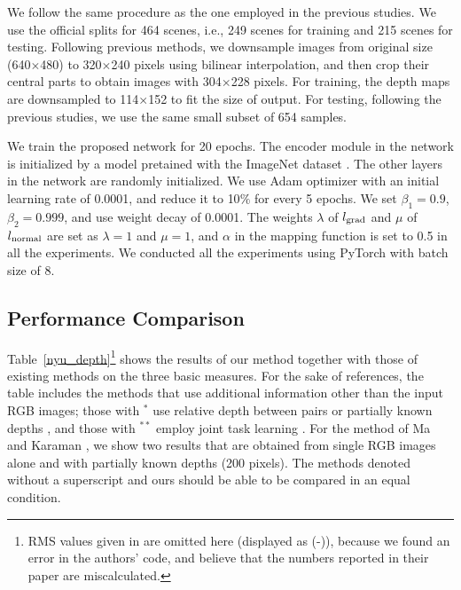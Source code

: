 \documentclass[10pt,twocolumn,letterpaper]{article}
\begin{document}
We follow the same procedure as the one employed in the previous studies.
We use the official splits for 464 scenes, i.e., 249 scenes for training and 215 scenes for testing. 
Following previous methods, we downsample images from original size (640$\times$480) to 320$\times$240 pixels using bilinear interpolation, and then crop their central parts to obtain images with 304$\times$228 pixels.  For training, the depth maps are downsampled to 114$\times$152 to fit the size of output. 
For testing, following the previous studies, we use the same small subset of 654 samples. 

We train the proposed network for 20 epochs. The encoder module in the network is initialized by a model pretained with the ImageNet dataset \cite{deng2009imagenet}. The other layers in the network are randomly initialized. 
We use Adam optimizer with an initial learning rate of 0.0001, and reduce it to 10$\%$ for every 5 epochs. We set $\beta_{1}=0.9$, $\beta_{2}=0.999$, and use weight decay of 0.0001.
The weights $\lambda$ of $l_{\rm grad}$ and $\mu$ of $l_{\rm normal}$ are set as $\lambda=1$ and $\mu=1$, and $\alpha$ in the mapping function is set to 0.5 in all the experiments. 
We conducted all the experiments using PyTorch \cite{paszke2017automatic} with batch size of 8. 




\subsection{Performance Comparison}
Table~\ref{nyu_depth}\footnote{RMS values given in \cite{ma2017sparse} are omitted here (displayed as (-)), because we found an error in the authors' code, and believe that the numbers reported in their paper are miscalculated.} shows the results of our method together with those of existing methods on the three basic measures. For the sake of references, the table includes the methods  that use additional information other than the input RGB images; those with $^*$ use relative depth between pairs or partially known depths \cite{chen2016single,ma2017sparse},
and those with  $^{**}$ employ joint task learning \cite{ladicky2014pulling,wang2015towards,Li2015DepthAS,Eigen2015PredictingDS,Dharmasiri2017JointPO,xu2018pad}. For the method of Ma and Karaman \cite{ma2017sparse}, we show two results that are obtained from single RGB images alone and with partially known depths (200 pixels). The methods denoted without a superscript \cite{Eigen2014depth,laina2016deeper,Xu2017MultiscaleCC,liu2015deep,cao2017estimating,chakrabarti2016depth,li2017two,lee2018single,qi2018geonet,fu2018deep} and ours should be able to be compared in an equal condition. 
\end{document}
